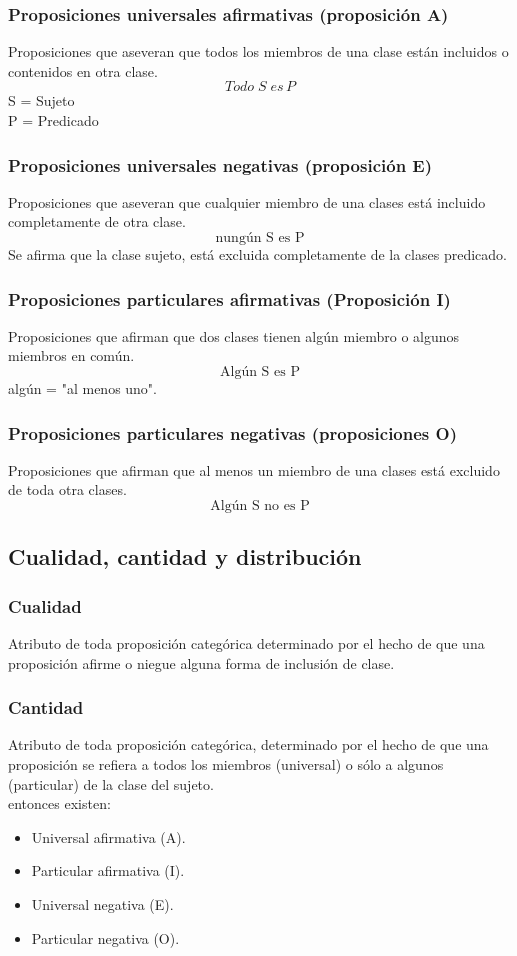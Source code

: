 \documentclass[10pt]{book} 						%
\begin{document}
\subsubsection{Proposiciones universales afirmativas (proposición A)}
Proposiciones que aseveran que todos los miembros de una clase están incluidos o contenidos en otra clase.
$$ Todo \; S \; es \, P $$
S = Sujeto \\
P = Predicado

\subsubsection{Proposiciones universales negativas (proposición E)}
Proposiciones que aseveran que cualquier miembro de una clases está incluido completamente de otra clase.
$$ \mbox{nungún S es P} $$
Se afirma que la clase sujeto, está excluida completamente de la clases predicado.

\subsubsection{Proposiciones particulares afirmativas (Proposición I)}
Proposiciones que afirman que dos clases tienen algún miembro o algunos miembros en común.
$$ \mbox{Algún S es P} $$
algún = "al menos uno".

\subsubsection{Proposiciones particulares negativas (proposiciones O)}
Proposiciones que afirman que al menos un miembro de una clases está excluido de toda otra clases.
$$ \mbox{Algún S no es P} $$

\subsection{Cualidad, cantidad y distribución}
\subsubsection{Cualidad}
Atributo de toda proposición categórica determinado por el hecho de que una proposición afirme o niegue alguna forma de inclusión de clase.

\subsubsection{Cantidad}
Atributo de toda proposición categórica, determinado por el hecho de que una proposición se refiera a todos los miembros (universal) o sólo a algunos (particular) de la clase del sujeto.\\
entonces existen:
\begin{itemize}
\item Universal afirmativa (A).
\item Particular afirmativa (I).
\item Universal negativa (E).
\item Particular negativa (O).
\end{itemize}
\end{document}
